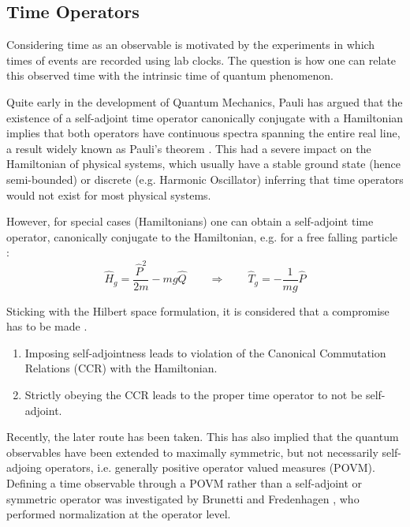\documentclass[twoside,a4paper,11pt]{article}
\numberwithin{equation}{section}
\begin{document}
\subsection{Time Operators}

Considering time as an observable is motivated by the experiments in which times of events are recorded using lab clocks. The question is how one can relate this observed time with the intrinsic time of quantum phenomenon. 

Quite early in the development of Quantum Mechanics, Pauli has argued that the existence of a self-adjoint time operator canonically conjugate with a Hamiltonian implies that both operators have continuous spectra spanning the entire real line, a result widely known as Pauli's theorem \cite{pauli1980general}. This had a severe impact on the Hamiltonian of physical systems, which usually have a stable ground state (hence semi-bounded) or discrete (e.g. Harmonic Oscillator) inferring that time operators would not exist for most physical systems. 

However, for special cases (Hamiltonians) one can obtain a self-adjoint time operator, canonically conjugate to the Hamiltonian, e.g. for a free falling particle \cite{BuschTEUR}:
\begin{equation}
    \hat{H}_g = \frac{\hat{P}^2}{2m} - mg\hat{Q} \qquad \Rightarrow \qquad  \hat{T}_g = -\frac{1}{mg}\hat{P}
\end{equation}

Sticking with the Hilbert space formulation, it is considered that a compromise has to be made \cite{GalaponCanonicalPairs}.
\begin{enumerate}
    \item Imposing self-adjointness leads to violation of the Canonical Commutation Relations (CCR) with the Hamiltonian.
    
    \item Strictly obeying the CCR leads to the proper time operator to not be self-adjoint.
\end{enumerate}

Recently, the later route has been taken. This has also implied that the quantum observables have been extended to maximally symmetric, but not necessarily self-adjoing operators, i.e. generally positive operator valued measures (POVM). Defining a time observable through a POVM rather than a self-adjoint or symmetric operator was investigated by Brunetti and Fredenhagen \cite{Fredenhagen}, who performed normalization at the operator level. 
\end{document}
